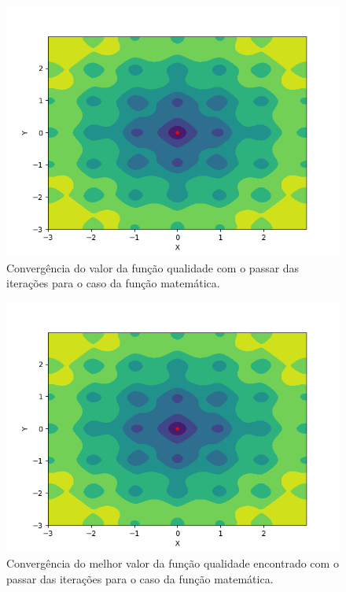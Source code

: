 \documentclass[conference]{IEEEtran}
\begin{document}
\begin{figure}[htbp]
\centering
\centerline{\includegraphics[scale=0.4]{imagens/ackley/ses.png}}
\caption{Convergência do valor da função qualidade com o passar das iterações para o caso da função matemática.}
\label{ackley/ses}
\end{figure} 

\begin{figure}[htbp]
\centering
\centerline{\includegraphics[scale=0.4]{imagens/ackley/cmaes.png}}
\caption{Convergência do melhor valor da função qualidade encontrado com o passar das iterações para o caso da função matemática.}
\label{ackley/cmaes}
\end{figure}
\end{document}
